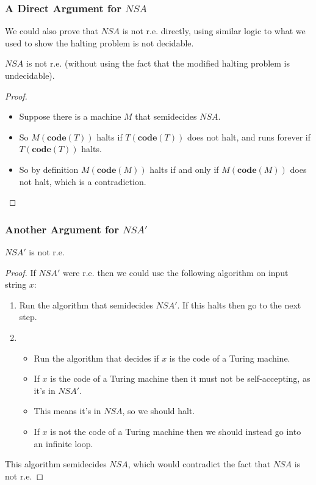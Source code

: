 \documentclass[handout]{beamer}
\newcommand{\co}{\mathbf{code}}
\begin{document}
\begin{frame}
\frametitle{A Direct Argument for $NSA$}
We could also prove that $NSA$ is not r.e. directly, using similar logic to what we used to show the halting problem is not decidable.
\vspace{0.4cm}
\begin{theorem}\label{T:NSAalt}
$NSA$ is not r.e. (without using the fact that the modified halting problem is undecidable).
\end{theorem}
\begin{proof}
\begin{itemize}
\item Suppose there is a machine $M$ that semidecides $NSA$. 
\item So $M(\co(T))$ halts if $T(\co(T))$ does not halt, and runs forever if $T(\co(T))$ halts. 
\item So by definition $M(\co(M))$ halts if and only if $M(\co(M))$ does not halt, which is a contradiction.
\end{itemize}
\end{proof}
\end{frame}

\begin{frame}
\frametitle{Another Argument for $NSA'$}
\begin{corollary}\label{C:NSA'}
$NSA'$ is not r.e.
\end{corollary}
\begin{proof}
If $NSA'$ were r.e. then we could use the following algorithm on input string $x$:
\begin{enumerate}
\item Run the algorithm that semidecides $NSA'$. If this halts then go to the next step.
\item \begin{itemize}
\item Run the algorithm that decides if $x$ is the code of a Turing machine. 
\item If $x$ is the code of a Turing machine then it must not be self-accepting, as it's in $NSA'$. 
\item This means it's in $NSA$, so we should halt. 
\item If $x$ is not the code of a Turing machine then we should instead go into an infinite loop. 
\end{itemize}  
\end{enumerate}
This algorithm semidecides $NSA$, which would contradict the fact that $NSA$ is not r.e. 
\end{proof}
\end{frame}
\end{document}
